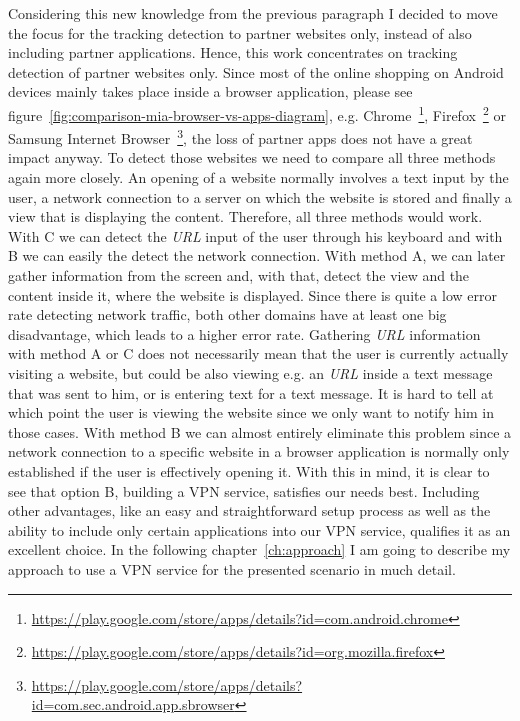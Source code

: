 Considering this new knowledge from the previous paragraph I decided to move the focus for the tracking detection to partner websites only, instead of also including partner applications. Hence, this work concentrates on tracking detection of partner websites only. Since most of the online shopping on Android devices mainly takes place inside a browser application, please see figure~\ref{fig:comparison-mia-browser-vs-apps-diagram}, e.g. Chrome~\footnote{\url{https://play.google.com/store/apps/details?id=com.android.chrome}}, Firefox~\footnote{\url{https://play.google.com/store/apps/details?id=org.mozilla.firefox}} or Samsung Internet Browser~\footnote{\url{https://play.google.com/store/apps/details?id=com.sec.android.app.sbrowser}}, the loss of partner \gls{apps} does not have a great impact anyway. To detect those websites we need to compare all three methods again more closely. An opening of a website normally involves a text input by the user, a network connection to a server on which the website is stored and finally a view that is displaying the content. Therefore, all three methods would work. With C we can detect the \emph{URL} input of the user through his keyboard and with B we can easily the detect the network connection. With method A, we can later gather information from the screen and, with that, detect the view and the content inside it, where the website is displayed. Since there is quite a low error rate detecting network traffic, both other domains have at least one big disadvantage, which leads to a higher error rate. Gathering \emph{URL} information with method A or C does not necessarily mean that the user is currently actually visiting a website, but could be also viewing e.g. an \emph{URL} inside a text message that was sent to him, or is entering text for a text message. It is hard to tell at which point the user is viewing the website since we only want to notify him in those cases. With method B we can almost entirely eliminate this problem since a network connection to a specific website in a browser application is normally only established if the user is effectively opening it. With this in mind, it is clear to see that option B, building a VPN service, satisfies our needs best. Including other advantages, like an easy and straightforward setup process as well as the ability to include only certain applications into our VPN service, qualifies it as an excellent choice. In the following chapter~\ref{ch:approach} I am going to describe my approach to use a VPN service for the presented scenario in much detail.

